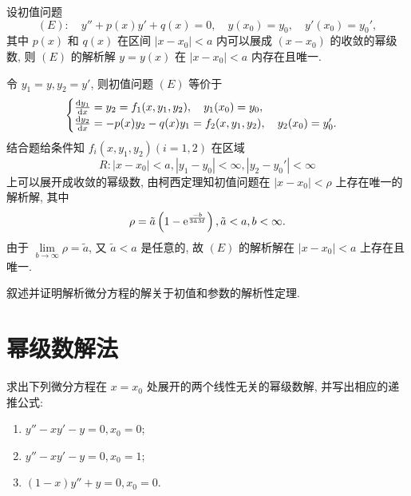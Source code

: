\begin{exercise}
  设初值问题
  \[(E)\colon\quad y''+p(x)y'+q(x)=0,\quad y(x_0)=y_0,\quad y'(x_0)=y_0',\]
  其中 $p(x)$ 和 $q(x)$ 在区间 $|x-x_0|<a$ 内可以展成 $(x-x_0)$ 的收敛的幂级数, 
  则 $(E)$ 的解析解 $y=y(x)$ 在 $|x-x_0|<a$ 内存在且唯一.
\end{exercise}

\begin{solution} 
  令 $y_1=y,y_2=y'$, 则初值问题 $(E)$ 等价于
  \[\begin{cases}
  \frac{\mathop{}\!\mathrm{d} y_1}{\mathop{}\!\mathrm{d} x} = y_2 = f_1(x,y_1,y_2),\quad y_1(x_0)=y_0,\\
  \frac{\mathop{}\!\mathrm{d} y_2}{\mathop{}\!\mathrm{d} x}=-p(x)y_2-q(x)y_1=f_2(x,y_1,y_2),\quad y_2(x_0)=y_0'.
  \end{cases}\]
  结合题给条件知 $f_i(x,y_1,y_2)(i=1,2)$ 在区域 
  \[R:|x-x_0|<a,|y_1-y_0|<\infty,|y_2-y_0'|<\infty\]
  上可以展开成收敛的幂级数, 由柯西定理知初值问题在 $|x-x_0|<\rho$ 上存在唯一的解析解, 其中
  \[\rho=\tilde{a}\left(1-\mathrm{e}^{\frac{-b}{3\tilde{a}M}}\right),\tilde{a}<a,b<\infty.\]
  由于 $\lim\limits_{b\to\infty}\rho=\tilde{a}$, 
  又 $\tilde{a}<a$ 是任意的, 故 $(E)$ 的解析解在 $|x-x_0|<a$ 上存在且唯一.
\end{solution}



\begin{exercise}
  叙述并证明解析微分方程的解关于初值和参数的解析性定理.
\end{exercise}



\section{幂级数解法}



\begin{exercise}
  求出下列微分方程在 $x=x_0$ 处展开的两个线性无关的幂级数解, 并写出相应的递推公式:
  \begin{enumerate}[(1)]
  \item $y''-xy'-y=0,x_0=0$;
  \item $y''-xy'-y=0,x_0=1$;
  \item $(1-x)y''+y=0,x_0=0$.
  \end{enumerate}
\end{exercise}

